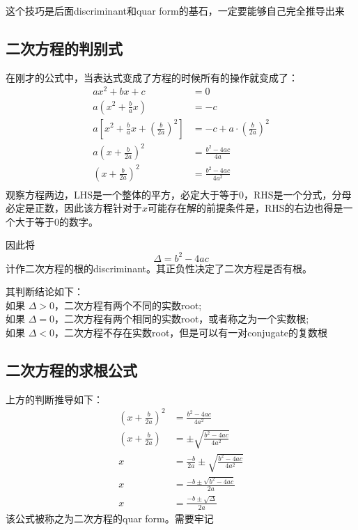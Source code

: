这个技巧是后面\gls{discriminant}和\gls{quar form}的基石，一定要能够自己完全推导出来


\subsection*{二次方程的判别式}
\label{subsec:Discriminant of Quadratic Function}
在刚才的公式中，当表达式变成了方程的时候所有的操作就变成了：
\begin{align*}
ax^2 +bx +c&=0\\
a\left( x^2+\frac{b}{a}x\right)  &=-c\\
a\left[ x^2+\frac{b}{a}x+\left(\frac{b}{2a}\right)^2\right] &=-c +a\cdot\left(\frac{b}{2a}\right)^2 \\
a\left(x+\frac{b}{2a}\right)^2 &=\frac{b^2-4ac}{4a}\\
\left(x+\frac{b}{2a}\right)^2 &=\frac{b^2-4ac}{4a^2}\\
\end{align*}
观察方程两边，LHS是一个整体的平方，必定大于等于0，RHS是一个分式，分母必定是正数，因此该方程针对于$x$可能存在解的前提条件是，RHS的右边也得是一个大于等于0的数字。

因此将
\[
	\Delta = b^2-4ac
\]
计作二次方程的根的\gls{discriminant}。其正负性决定了二次方程是否有根。

其判断结论如下：\\
如果 $\Delta>0$，二次方程有两个不同的实数\gls{root};\\
如果 $\Delta=0$，二次方程有两个相同的实数\gls{root}，或者称之为一个实数根;\\
如果 $\Delta<0$，二次方程不存在实数\gls{root}，但是可以有一对\gls{conjugate}的复数根


\subsection*{二次方程的求根公式}
\label{subsec:Quadratic Formula}
上方的判断推导如下：
\begin{align*}
	\left(x+\frac{b}{2a}\right)^2 &= \frac{b^2-4ac}{4a^2}\\
	\left(x+\frac{b}{2a}\right)	&= \pm\sqrt {\frac{b^2-4ac}{4a^2}}\\
	x &= \frac{-b}{2a}\pm\sqrt {\frac{b^2-4ac}{4a^2}}\\
	x &= \frac{-b\pm \sqrt{b^2-4ac}}{2a}\\
	x &= \frac{-b\pm \sqrt{\Delta}}{2a}
\end{align*}
该公式被称之为二次方程的\gls{quar form}。需要牢记
\clearpage


